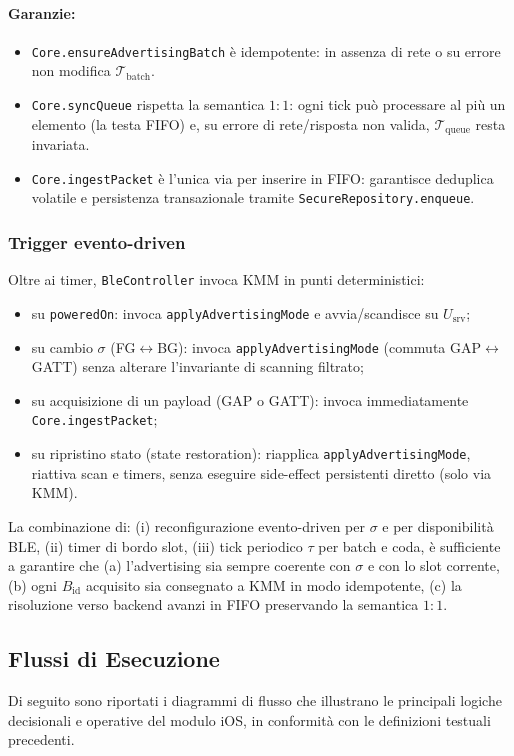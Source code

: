 \documentclass[a4paper,11pt,table,dvipsnames]{article}
\begin{document}
\paragraph{Garanzie:}
\begin{itemize}[nosep]
    \item \texttt{Core.ensureAdvertisingBatch} è idempotente: in assenza di rete o su errore non modifica \(\mathcal{T}_{\text{batch}}\).
    \item \texttt{Core.syncQueue} rispetta la semantica \(1{:}1\): ogni tick può processare al più un elemento (la testa FIFO) e, su errore di rete/risposta non valida, \(\mathcal{T}_{\text{queue}}\) resta invariata.
    \item \texttt{Core.ingestPacket} è l’unica via per inserire in FIFO: garantisce deduplica volatile e persistenza transazionale tramite \texttt{SecureRepository.enqueue}.
\end{itemize}

\subsubsection{Trigger evento-driven}
Oltre ai timer, \texttt{BleController} invoca KMM in punti deterministici:
\begin{itemize}[nosep]
    \item su \texttt{poweredOn}: invoca \texttt{applyAdvertisingMode} e avvia/scandisce su \(U_{\text{srv}}\);
    \item su cambio \(\sigma\) (FG\(\leftrightarrow\)BG): invoca \texttt{applyAdvertisingMode} (commuta GAP\(\leftrightarrow\)GATT) senza alterare l’invariante di scanning filtrato;
    \item su acquisizione di un payload (GAP o GATT): invoca immediatamente \texttt{Core.ingestPacket};
    \item su ripristino stato (state restoration): riapplica \texttt{applyAdvertisingMode}, riattiva scan e timers, senza eseguire side-effect persistenti diretto (solo via KMM).
\end{itemize}
La combinazione di: (i) reconfigurazione evento-driven per \(\sigma\) e per disponibilità BLE, (ii) timer di bordo slot, (iii) tick periodico \(\tau\) per batch e coda, è sufficiente a garantire che (a) l’advertising sia sempre coerente con \(\sigma\) e con lo slot corrente, (b) ogni \(B_{\text{id}}\) acquisito sia consegnato a KMM in modo idempotente, (c) la risoluzione verso backend avanzi in FIFO preservando la semantica \(1{:}1\).

\subsection{Flussi di Esecuzione}
Di seguito sono riportati i diagrammi di flusso che illustrano le principali logiche decisionali e operative del modulo iOS, in conformità con le definizioni testuali precedenti.
\end{document}
